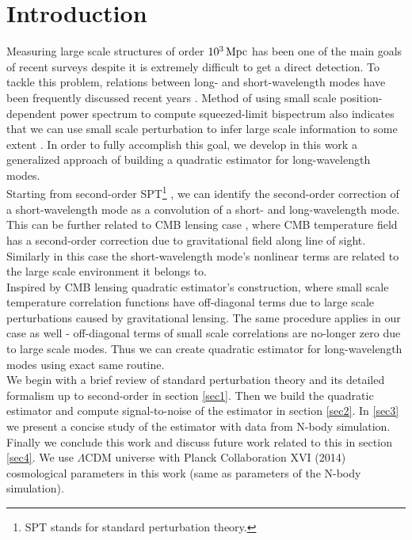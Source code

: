 \documentclass[prd,amsmath,amssymb,floatfix,superscriptaddress,nofootinbib,twocolumn]{revtex4-1}
\begin{document}
\section{Introduction}
Measuring large scale structures of order $10^3\, \rm Mpc$ has been one of the main goals of recent surveys despite it is extremely difficult to get a direct detection. To tackle this problem, relations between long- and short-wavelength modes have been frequently discussed recent years \cite{Baldauf:2011fer}\cite{Barreira:2017res}. Method of using small scale position-dependent power spectrum to compute squeezed-limit bispectrum also indicates that we can use small scale perturbation to infer large scale information to some extent \cite{Chiang:2014pos}\cite{Chiang:2015poss}. In order to fully accomplish this goal, we develop in this work a generalized approach of building a quadratic estimator for long-wavelength modes. \\
Starting from second-order SPT\footnote{SPT stands for standard perturbation theory.} \cite{Goroff:1986sts}\cite{Makino:1992fs}\cite{Jain:1994sop}, we can identify the second-order correction of a short-wavelength mode as a convolution of a short- and long-wavelength mode. This can be further related to CMB lensing case \cite{Hu:2002mr}, where CMB temperature field has a second-order correction due to gravitational field along line of sight. Similarly in this case the short-wavelength mode's nonlinear terms are related to the large scale environment it belongs to.
\\
Inspired by CMB lensing quadratic estimator's construction, where small scale temperature correlation functions have off-diagonal terms due to
large scale perturbations caused by gravitational lensing. The same procedure applies in our case as well - off-diagonal terms of small scale correlations are no-longer zero due to large scale modes. Thus we can create quadratic estimator for long-wavelength modes using exact same routine. \\
We begin with a brief review of standard perturbation theory and its detailed formalism up to second-order in section \ref{sec1}. Then we build the quadratic estimator and compute signal-to-noise of the estimator in section \ref{sec2}. In \ref{sec3} we present a concise study of the estimator with data from N-body simulation. Finally we conclude this work and discuss future work related to this in section \ref{sec4}. We use $\Lambda$CDM universe with Planck Collaboration XVI (2014) \cite{Planck:2014cos} cosmological parameters in this work (same as parameters of the N-body simulation).
\end{document}
